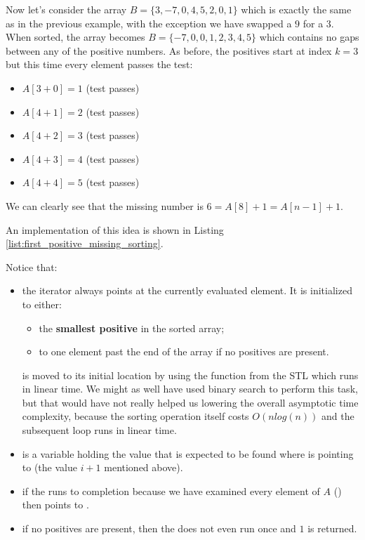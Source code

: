 Now let's consider the array $B=\{ 3,-7,0,4,5,2,0,1\}$ which is exactly the same as in the previous example, with the exception we have swapped a $9$ for a $3$. When sorted, the array
becomes $B=\{ -7,0,0,1,2,3,4,5\}$ which contains no gaps between any of the positive numbers. As before, the positives start at index $k=3$ but this time every element passes the test:
\begin{itemize}
	\item $A[3+0] = 1$ (test passes)
	\item $A[4+1] = 2$ (test passes)
	\item $A[4+2] = 3$ (test passes)
	\item $A[4+3] = 4$ (test passes)
	\item $A[4+4] = 5$ (test passes)
\end{itemize}
We can clearly see that the missing number is $6 = A[8]+1 = A[n-1]+1$.

An implementation of this idea is shown in Listing
\ref{list:first_positive_missing_sorting}.



Notice that:
\begin{itemize}
	\item the iterator  always points at the currently evaluated element. 
	It is initialized to either:
	\begin{itemize}
		\item the \textbf{smallest positive} in the sorted array;
		\item to one element past the end of the array if no positives are present.
	\end{itemize}
	 is moved to its initial location by using the  function from the STL which runs in linear time. We might as well have used binary search to perform this task, but that would have not really helped us lowering the overall asymptotic time complexity, because the sorting operation itself costs $O(nlog(n))$ and the subsequent  loop runs in linear time. 
	\item {} is a variable holding the value that is expected to be found where  is pointing to (the value $i+1$ mentioned above).
	\item if the  runs to completion because we have examined every element of $A$ () then  points to .
	\item if no positives are present, then the  does not even run once and $1$ is returned.
\end{itemize}

